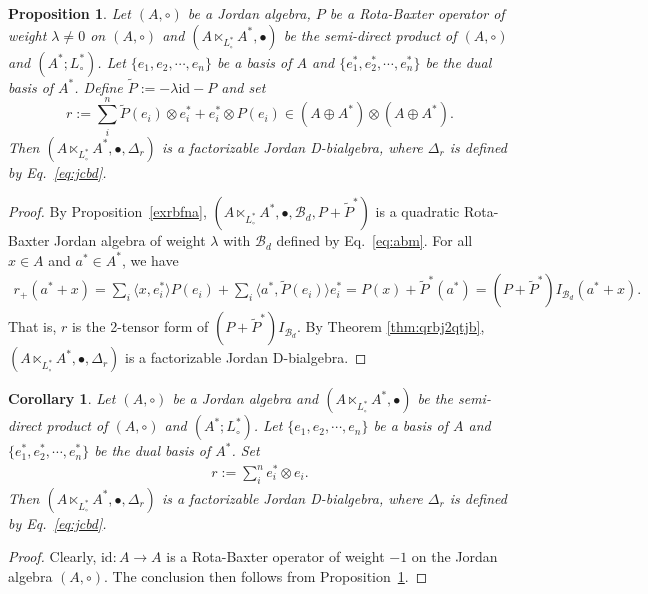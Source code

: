 \documentclass[12pt, reqno, a4paper]{amsart}
\newtheorem{corollary}[theorem]{Corollary}
\newtheorem{proposition}[theorem]{Proposition}
\theoremstyle{definition}
\newcommand{\id}{\mathrm{id}}
\begin{document}
\begin{proposition}\label{RBJ:XY}
	Let $(A, \circ)$ be a Jordan algebra, $P$ be a Rota-Baxter operator of weight $\lambda \ne 0$ on $(A, \circ)$ and $(A \ltimes_{L_{\circ}^{*}} A^{*}, \bullet)$ be the semi-direct product of $(A, \circ)$ and $(A^*; L_{\circ}^*)$. 
	Let $\{e_1, e_2, \cdots, e_n\}$ be a basis of $A$ and $\{e_1^*, e_2^*, \cdots, e_n^*\}$ be the dual basis of $A^*$. Define $\tilde{P} := - \lambda \id - P$ and set
	\begin{equation*}
		r := \sum_{i}^n \tilde{P} (e_i) \otimes e_i^{*} + e_i^*\otimes P(e_i) \in (A \oplus A^*) \otimes (A \oplus A^*).
	\end{equation*}
	Then $(A \ltimes_{L_{\circ}^{*}} A^{*}, \bullet, \Delta_r)$ is a factorizable Jordan D-bialgebra, where $\Delta_{r}$ is defined by Eq.~\eqref{eq:jcbd}.
\end{proposition}
\begin{proof}
	By Proposition~\ref{exrbfna}, $(A \ltimes_{L_{\circ}^{*}} A^{*}, \bullet, \mathcal{B}_d, P + \tilde{P}^{*})$ is a quadratic Rota-Baxter Jordan algebra of weight $\lambda$ with $\mathcal{B}_d$ defined by Eq.~\eqref{eq:abm}. 
	For all $x \in A$ and $a^* \in A^*$, we have
	\begin{align*}
		r_{+}(a^* + x) =  \sum_{i}\langle x, e_{i}^*\rangle P(e_i) + \sum_{i}\langle a^*, \tilde{P}(e_i)\rangle e_{i}^* = P(x) + \tilde{P}^{*}(a^*) =  (P+\tilde{P}^{*}) I_{\mathcal{B}_d}(a^* + x).
	\end{align*}
	That is, $r$ is the 2-tensor form of $(P+\tilde{P}^{*}) I_{\mathcal{B}_d}$.
	By Theorem \ref{thm:qrbj2qtjb}, $(A \ltimes_{L_{\circ}^{*}} A^{*}, \bullet, \Delta_r)$ is a factorizable Jordan D-bialgebra.
\end{proof}



\begin{corollary}\label{RBPoissonof3}
	Let $(A, \circ)$ be a Jordan algebra and $(A \ltimes_{L_{\circ}^{*}} A^{*}, \bullet)$ be the semi-direct product of $(A, \circ)$ and $(A^*; L_{\circ}^*)$.
	Let $\{e_1, e_2, \cdots, e_n\}$ be a basis of $A$ and $\{e_1^*, e_2^*, \cdots, e_n^*\}$ be the dual basis of $A^*$. 
	Set
	\begin{align*}
		r := \sum_{i}^n e_i^*\otimes e_i.
	\end{align*}
	Then $(A \ltimes_{L_{\circ}^{*}} A^{*}, \bullet, \Delta_r)$ is a factorizable Jordan D-bialgebra, where $\Delta_{r}$ is defined by Eq.~\eqref{eq:jcbd}.
\end{corollary}
\begin{proof}
	Clearly, $\id: A \to A$ is a Rota-Baxter operator of weight $-1$ on the Jordan algebra $(A, \circ)$. 
	The conclusion then follows from Proposition~\ref{RBJ:XY}.
\end{proof}
\end{document}
